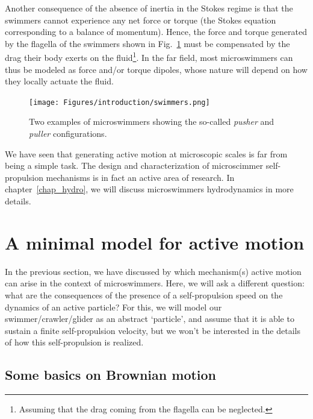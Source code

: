 Another consequence of the absence of inertia in the Stokes regime is that the swimmers cannot experience any net force or torque (the Stokes equation corresponding to a balance of momentum).
Hence, the force and torque generated by the flagella of the swimmers shown in Fig.~\ref{fig: swimmers} must be compensated by the drag their body exerts on the fluid\footnote{Assuming that the drag coming from the flagella can be neglected.}. 
In the far field, most microswimmers can thus be modeled as force and/or torque dipoles, whose nature will depend on how they locally actuate the fluid.

\begin{figure}[!htb]
    \centering
    \texttt{[image: Figures/introduction/swimmers.png]}
    \caption{Two examples of microswimmers showing the so-called \textit{pusher} and \textit{puller} configurations.}
    \label{fig: swimmers}
\end{figure}

We have seen that generating active motion at microscopic scales is far from being a simple task. The design and characterization of microscimmer self-propulsion mechanisms is in fact an active area of research. 
In chapter~\ref{chap_hydro}, we will discuss microswimmers hydrodynamics in more details.


\section{A minimal model for active motion}
\label{intro_ABM}

In the previous section, we have discussed by which mechanism(s) active motion can arise in the context of microswimmers.
Here, we will ask a different question: what are the consequences of the presence of a self-propulsion speed on the dynamics of an active particle?
For this, we will model our swimmer/crawler/glider as an abstract `particle', and assume that it is able to sustain a finite self-propulsion velocity, but we won't be interested in the details of how this self-propulsion is realized.


\subsection{Some basics on Brownian motion}

